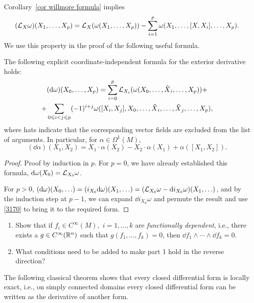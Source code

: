 Corollary~\ref{cor willmore formula} implies
\[(\mathcal{L}_X\omega) (X_1,\ldots,X_p)=\mathcal{L}_X(\omega(X_1,\ldots,X_p))-\sum_{i=1}^p\omega(X_1,\ldots,[X,X_i],\ldots,X_p).\label{3170}\]
We use this property in the proof of the following useful formula.

\begin{prop}[{{\cite[Prop.~4.1.6]{RS1}}}]\label{prop 4.1.6 RS1}
    The following explicit coordinate-independent formula for the exterior derivative holds:
    \begin{multline}
        (\dd\omega)(X_0,\ldots,X_{p})=\sum_{i=0}^p \Lie_{X_i}(\omega(X_0,\ldots,\wh{X}_i,\ldots,X_p))+\\+\sum_{0\leq i<j\leq p}(-1)^{i+j}\omega([X_i,X_j],X_0,\ldots,\wh{X}_i,\ldots,\wh{X}_j,\ldots,X_p),
    \end{multline}
    where hats indicate that the corresponding vector fields are excluded from the list of arguments. In particular, for $\alpha\in\Omega^1(M)$,
    \[(\dd\alpha)(X_1,X_2)=X_1\cdot \alpha(X_2)-X_2\cdot\alpha(X_1)+\alpha ([X_1,X_2]).\label{eq prop 4.1.6}\]
\end{prop}
\begin{proof}
Proof by induction in $p$. For $p=0$, we have already established this formula, ${\mathrm{d}} \omega(X_0)=\mathcal{L}_{X_0}\omega$.

For $p>0$, $({\mathrm{d}}\omega)(X_0,\ldots )=(i_{X_0}{\mathrm{d}}\omega)(X_1,\ldots)=(\mathcal{L}_{X_0}\omega-{\mathrm{d}} i_{X_0}\omega)(X_1,\ldots)$, and by the induction step at $p-1$, we can expand $\dd i_{X_0}\omega$ and permute the result and use \eqref{3170} to bring it to the required form.
\end{proof}

\begin{xca}
    \begin{enumerate}
        \item Show that if $f_i\in C^\infty(M),$ $i=1,\ldots,k$ are \emph{functionally dependent}, i.e., there exists a $g\in C^\infty(\mathbb{R}^n)$ such that $g(f_1,\ldots,f_k)=0$, then $\dd f_1\wedge\cdots\wedge \dd f_k=0$.
        \item What conditions need to be added to make part 1 hold in the reverse direction?
    \end{enumerate}
\end{xca}

The following classical theorem shows that every closed differential form is locally exact, i.e., on simply connected domains every closed differential form can be written as the derivative of another form.


